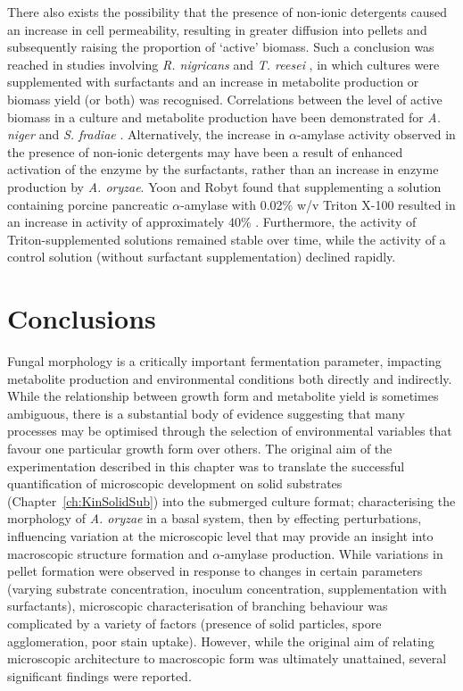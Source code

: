 There also exists the possibility that the presence of non-ionic detergents caused an increase in cell permeability, resulting in greater diffusion into pellets and subsequently raising the proportion of \lq active' biomass. Such a conclusion was reached in studies involving \emph{R. nigricans} \cite{znidarsic2000} and \emph{T. reesei} \cite{domingues2000}, in which cultures were supplemented with surfactants and an increase in metabolite production or biomass yield (or both) was recognised. Correlations between the level of active biomass in a culture and metabolite production have been demonstrated for \emph{A. niger} \cite{elenshasy2006} and \emph{S. fradiae}  \cite{ypark1997}. Alternatively, the increase in $\alpha$-amylase activity observed in the presence of non-ionic detergents may have been a result of enhanced activation of the enzyme by the surfactants, rather than an increase in enzyme production by \emph{A. oryzae}. Yoon and Robyt found that supplementing a solution containing porcine pancreatic $\alpha$-amylase with 0.02\% w/v Triton X-100 resulted in an increase in activity of approximately 40\% \cite{yoon2005}. Furthermore, the activity of Triton-supplemented solutions remained stable over time, while the activity of a control solution (without surfactant supplementation) declined rapidly.

\section{Conclusions}

Fungal morphology is a critically important fermentation parameter, impacting metabolite production and environmental conditions both directly and indirectly. While the relationship between growth form and metabolite yield is sometimes ambiguous, there is a substantial body of evidence suggesting that many processes may be optimised through the selection of environmental variables that favour one particular growth form over others. The original aim of the experimentation described in this chapter was to translate the successful quantification of microscopic development on solid substrates (Chapter~\ref{ch:KinSolidSub}) into the submerged culture format; characterising the morphology of \emph{A. oryzae} in a basal system, then by effecting perturbations, influencing variation at the microscopic level that may provide an insight into macroscopic structure formation and $\alpha$-amylase production. While variations in pellet formation were observed in response to changes in certain parameters (varying substrate concentration, inoculum concentration, supplementation with surfactants), microscopic characterisation of branching behaviour was complicated by a variety of factors (presence of solid particles, spore agglomeration, poor stain uptake). However, while the original aim of relating microscopic architecture to macroscopic form was ultimately unattained, several significant findings were reported.

